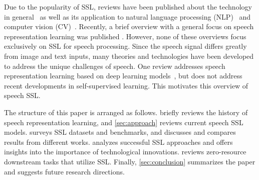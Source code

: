 Due to the popularity of SSL, reviews have been published about the
technology in general~\cite{bommasani_opportunities_2021,ericsson_selfsupervised_2022,liu_selfsupervised_2021} as well as its application to natural language processing (NLP)~\cite{rogers_primer_2020,liu_pretrain_2021,xia_which_2020,qiu_pretrained_2020} and computer vision (CV)~\cite{jing_selfsupervised_2021}. Recently, a brief overview with a general focus on speech representation learning was published \cite{borgholt_brief_2022}. 
However, none of these overviews focus exclusively on SSL for speech processing. Since the speech signal differs greatly from image and text inputs, many  theories  and technologies have been developed to address the unique challenges of speech. 
One review addresses speech representation learning based on deep learning models~\cite{latif_deep_2021}, but does not address recent developments in self-supervised learning. This motivates this overview of speech SSL.


The structure of this paper is arranged as follows. 
briefly reviews the history of speech representation learning, and
\cref{sec:approach} reviews current speech SSL models.
 surveys SSL datasets and benchmarks, 
and discusses and compares results from different works. 
analyzes successful SSL approaches and offers insights into the
importance of technological innovations.  reviews 
zero-resource downstream tasks that utilize SSL. 
Finally, \cref{sec:conclusion} summarizes the paper and suggests 
future research directions.


